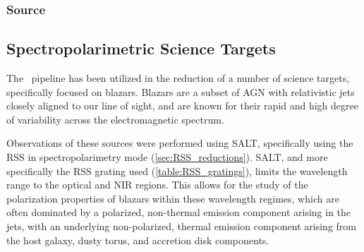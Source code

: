 
\subsubsection{Source}






\subsection{Spectropolarimetric Science Targets} \label{sec:specpol_sci}




The \stops\ pipeline has been utilized in the reduction of a number of science targets, specifically focused on blazars. Blazars are a subset of \gls{AGN} with relativistic jets closely aligned to our line of sight, and are known for their rapid and high degree of variability across the electromagnetic spectrum.

Observations of these sources were performed using \gls{SALT}, specifically using the \gls{RSS} in spectropolarimetry mode (\autoref{sec:RSS_reductions}). \gls{SALT}, and more specifically the \gls{RSS} grating used (\autoref{table:RSS_gratings}), limits the wavelength range to the optical and \gls{NIR} regions. This allows for the study of the polarization properties of blazars within these wavelength regimes, which are often dominated by a polarized, non-thermal emission component arising in the jets, with an underlying non-polarized, thermal emission component arising from the host galaxy, dusty torus, and accretion disk components.

